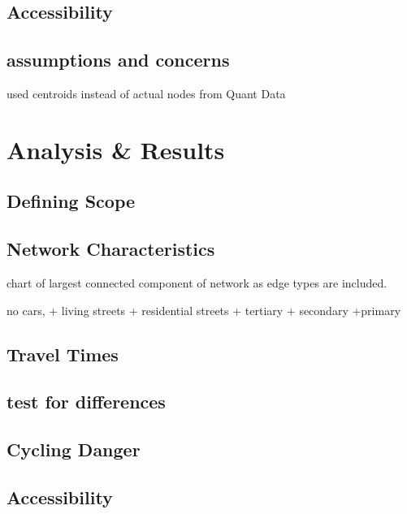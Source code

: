 \documentclass[11pt]{article} %
\begin{document}
\subsection{Accessibility}

\subsection{assumptions and concerns}

used centroids instead of actual nodes from Quant Data


\section{Analysis \& Results}

\subsection{Defining Scope}

\subsection{Network Characteristics}


chart of largest connected component of network as edge types are included. 

no cars,
+ living streets
+ residential streets
+ tertiary 
+ secondary
+primary

\subsection{Travel Times}

\subsection{test for differences}

\subsection{Cycling Danger}

\subsection{Accessibility}

\end{document}
